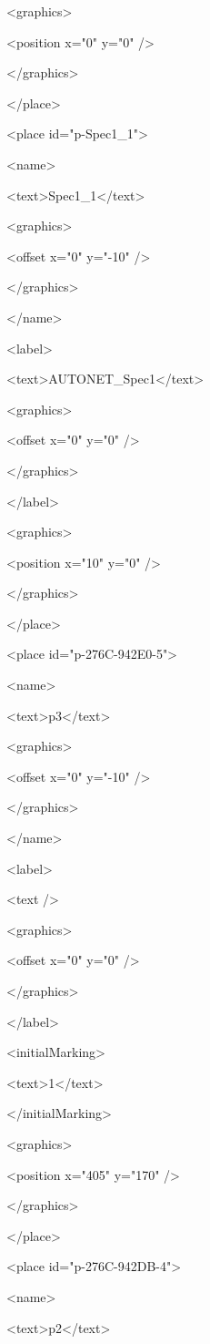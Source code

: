     <graphics>

     <position x="0" y="0" />

    </graphics>

   </place>

   <place id="p-Spec1\_1">

    <name>

     <text>Spec1\_1</text>

     <graphics>

      <offset x="0" y="-10" />

     </graphics>

    </name>

    <label>

     <text>AUTONET\_Spec1</text>

     <graphics>

      <offset x="0" y="0" />

     </graphics>

    </label>

    <graphics>

     <position x="10" y="0" />

    </graphics>

   </place>

   <place id="p-276C-942E0-5">

    <name>

     <text>p3</text>

     <graphics>

      <offset x="0" y="-10" />

     </graphics>

    </name>

    <label>

     <text />

     <graphics>

      <offset x="0" y="0" />

     </graphics>

    </label>

    <initialMarking>

     <text>1</text>

    </initialMarking>

    <graphics>

     <position x="405" y="170" />

    </graphics>

   </place>

   <place id="p-276C-942DB-4">

    <name>

     <text>p2</text>


